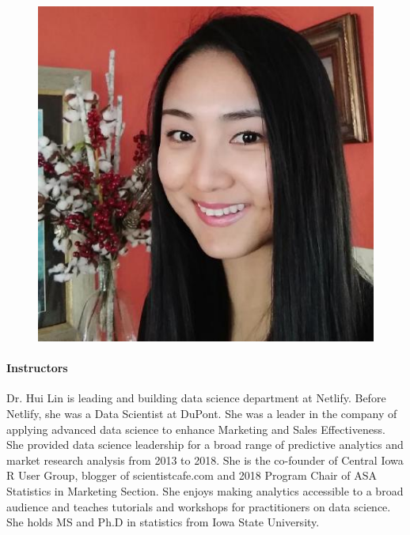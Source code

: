 \documentclass[11pt]{article}
\begin{document}
\begin{figure}
  \vspace{-25pt}
  \begin{center}
    \includegraphics[width=\linewidth]{Hui-Lin.png}
  \end{center}  
  \vspace{-25pt}
\end{figure}
\paragraph{Instructors}
Dr. Hui Lin is leading and building data science department at
Netlify. Before Netlify, she was a Data Scientist at DuPont. She was a
leader in the company of applying advanced data science to enhance
Marketing and Sales Effectiveness. She provided data science
leadership for a broad range of predictive analytics and market
research analysis from 2013 to 2018. She is the co-founder of Central
Iowa R User Group, blogger of scientistcafe.com and 2018 Program Chair
of ASA Statistics in Marketing Section. She enjoys making analytics
accessible to a broad audience and teaches tutorials and workshops for
practitioners on data science. She holds MS and Ph.D in statistics
from Iowa State University.
\end{document}
